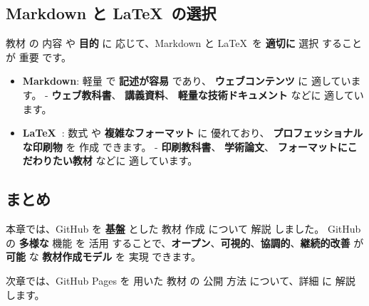 \subsection{Markdown と \LaTeX\  の選択}

教材 の 内容 や \textbf{目的} に 応じて、Markdown と \LaTeX\  を \textbf{適切に} 選択 することが 重要 です。

\begin{itemize}
    \item \textbf{Markdown}: 軽量 で \textbf{記述が容易} であり、 \textbf{ウェブコンテンツ} に 適しています。
        - \textbf{ウェブ教科書}、 \textbf{講義資料}、 \textbf{軽量な技術ドキュメント} などに 適しています。
    \item \textbf{\LaTeX\ }: 数式 や \textbf{複雑なフォーマット} に 優れており、 \textbf{プロフェッショナルな印刷物} を 作成 できます。
        - \textbf{印刷教科書}、 \textbf{学術論文}、 \textbf{フォーマットにこだわりたい教材} などに 適しています。
\end{itemize}

\subsection{まとめ}

本章では、GitHub を \textbf{基盤} とした 教材 作成 について 解説 しました。
GitHub の \textbf{多様な} 機能 を 活用 することで、\textbf{オープン}、\textbf{可視的}、\textbf{協調的}、\textbf{継続的改善} が \textbf{可能} な \textbf{教材作成モデル} を 実現 できます。

次章では、GitHub Pages を 用いた 教材 の 公開 方法 について、詳細 に 解説 します。
